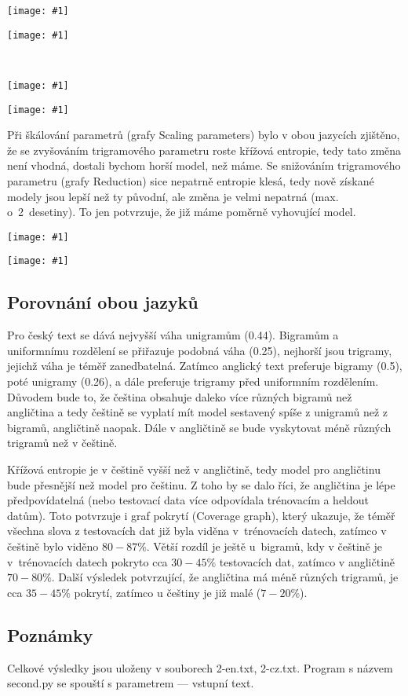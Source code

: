 \documentclass[12pt, a4paper]{report}
\theoremstyle{remark}
\def\obrazek#1#2{
\begin{center}
 		\texttt{[image: \#1]}%
\end{center}
 }
\begin{document}
\begin{multicols}{2}
\obrazek{img-cz-reduction.png}{0.5}
\columnbreak
\obrazek{img-en-reduction.png}{0.5}
\end{multicols}
\
\obrazek{img-cz-scaling.png}{1}
\obrazek{img-en-scaling.png}{1}
Při škálování parametrů (grafy Scaling parameters) bylo v obou jazycích zjištěno, že se zvyšováním trigramového parametru roste křížová entropie, tedy tato změna není vhodná, dostali bychom horší model, než máme. Se snižováním trigramového parametru (grafy Reduction) sice nepatrně entropie klesá, tedy nově získané modely jsou lepší než ty původní, ale změna je velmi nepatrná (max. o~2~desetiny). To jen potvrzuje, že již máme poměrně vyhovující model.

\obrazek{img-cz-coverage.png}{1}
\obrazek{img-en-coverage.png}{1}


\subsection*{Porovnání obou jazyků}
Pro český text se dává nejvyšší váha unigramům (0.44). Bigramům a uniformnímu rozdělení se přiřazuje podobná váha (0.25), nejhorší jsou trigramy, jejichž váha je téměř zanedbatelná. Zatímco anglický text preferuje bigramy (0.5), poté unigramy (0.26), a dále preferuje trigramy před uniformním rozdělením. Důvodem bude to, že čeština obsahuje daleko více různých bigramů než angličtina a tedy češtině se vyplatí mít model sestavený spíše z unigramů než z bigramů, angličtině naopak. Dále v angličtině se bude vyskytovat méně různých trigramů než v češtině.

Křížová entropie je v češtině vyšší než v angličtině, tedy model pro angličtinu bude přesnější než model pro češtinu. Z toho by se dalo říci, že angličtina je lépe předpovídatelná (nebo testovací data více odpovídala trénovacím a heldout datům). Toto potvrzuje i graf pokrytí (Coverage graph), který ukazuje, že téměř všechna slova z testovacích dat již byla viděna v~trénovacích datech, zatímco v češtině bylo viděno $80-87 \%$. Větší rozdíl je ještě u~bigramů, kdy v češtině je v~trénovacích datech pokryto cca $30-45 \%$ testovacích dat, zatímco v angličtině $70-80 \%$. Další výsledek potvrzující, že angličtina má méně různých trigramů, je cca $35-45\%$ pokrytí, zatímco u češtiny je již malé ($7-20\%$).

\subsection*{Poznámky}
Celkové výsledky jsou uloženy v souborech 2-en.txt, 2-cz.txt. Program s názvem second.py se spouští s parametrem --- vstupní text.
\end{document}
